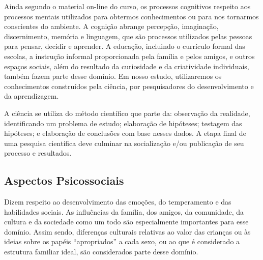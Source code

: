 Ainda segundo o material on-line do curso, os processos cognitivos respeito aos processos mentais utilizados para obtermos conhecimentos ou para nos tornarmos conscientes do ambiente. A cognição abrange percepção, imaginação, discernimento, memória e linguagem, que são processos utilizados pelas pessoas para pensar, decidir e aprender.  A educação, incluindo o currículo formal das escolas, a instrução informal proporcionada pela família e pelos amigos, e outros espaços sociais, além do resultado da curiosidade e da criatividade individuais, também fazem parte desse domínio.
Em nosso estudo, utilizaremos os conhecimentos construídos pela ciência, por pesquisadores do desenvolvimento e da aprendizagem.

A ciência se utiliza do método científico que parte da: observação da realidade, identificando um problema de estudo; elaboração de hipóteses; testagem das hipóteses; e elaboração de conclusões com base nesses dados. A etapa final de uma pesquisa científica deve culminar na socialização e/ou publicação de seu processo e resultados.

\subsection{Aspectos Psicossociais}

Dizem respeito ao desenvolvimento das emoções, do temperamento e das habilidades sociais. As influências da família, dos amigos, da comunidade, da cultura e da sociedade como um todo são especialmente importantes para esse domínio. Assim sendo, diferenças culturais relativas ao valor das crianças ou às ideias sobre os papéis “apropriados” a cada sexo, ou ao que é considerado a estrutura familiar ideal, são considerados parte desse domínio.

